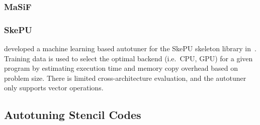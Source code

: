 \subsubsection{MaSiF}



\subsubsection{SkePU}

\citeauthor{Dastgeer2011} developed a machine learning based autotuner
for the SkePU skeleton library in~\cite{Dastgeer2011}. Training data
is used to select the optimal backend (i.e.\ CPU, GPU) for a given
program by estimating execution time and memory copy overhead based on
problem size. There is limited cross-architecture evaluation, and the
autotuner only supports vector operations.

\subsection{Autotuning Stencil Codes}

